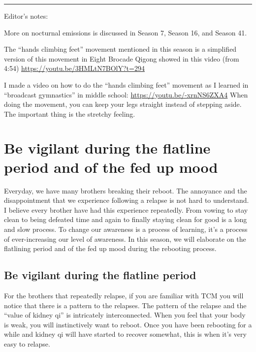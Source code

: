 \documentclass[
]{book}
\begin{document}
\begin{center}\rule{0.5\linewidth}{0.5pt}\end{center}

Editor's notes:

More on nocturnal emissions is discussed in Season 7, Season 16, and Season 41.

The ``hands climbing feet'' movement mentioned in this season is a simplified version of this movement in Eight Brocade Qigong showed in this video (from 4:54) \url{https://youtu.be/3HMLtN7BOlY?t=294}

I made a video on how to do the ``hands climbing feet'' movement as I learned in ``broadcast gymnastics'' in middle school: \url{https://youtu.be/-xrnNS6ZXA4}
When doing the movement, you can keep your legs straight instead of stepping aside. The important thing is the stretchy feeling.

\hypertarget{be-vigilant-during-the-flatline-period-and-of-the-fed-up-mood}{%
\chapter{Be vigilant during the flatline period and of the fed up mood}\label{be-vigilant-during-the-flatline-period-and-of-the-fed-up-mood}}

Everyday, we have many brothers breaking their reboot. The annoyance and the disappointment that we experience following a relapse is not hard to understand. I believe every brother have had this experience repeatedly. From vowing to stay clean to being defeated time and again to finally staying clean for good is a long and slow process. To change our awareness is a process of learning, it's a process of ever-increasing our level of awareness. In this season, we will elaborate on the flatlining period and of the fed up mood during the rebooting process.

\hypertarget{be-vigilant-during-the-flatline-period}{%
\section{Be vigilant during the flatline period}\label{be-vigilant-during-the-flatline-period}}

For the brothers that repeatedly relapse, if you are familiar with TCM you will notice that there is a pattern to the relapses. The pattern of the relapse and the ``value of kidney qi'' is intricately interconnected. When you feel that your body is weak, you will instinctively want to reboot. Once you have been rebooting for a while and kidney qi will have started to recover somewhat, this is when it's very easy to relapse.
\end{document}

